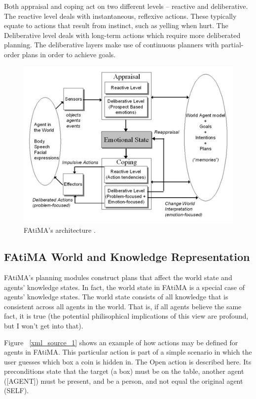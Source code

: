 \documentclass{article}
\begin{document}
Both appraisal and coping act on two different levels -- reactive and
deliberative.  The reactive level deals with instantaneous, reflexive
actions.  These typically equate to actions that result from instinct,
such as yelling when hurt.  The Deliberative level deals with long-term
actions which require more deliberated planning.  The deliberative layers
make use of continuous planners with partial-order plans in order to
achieve goals. \cite{Paiva2005, Russell2003}

\begin{figure}[htb]

\includegraphics{Graphics/fatimadiagram.png}
\caption{FAtiMA's architecture \cite{Paiva2005}.}
\label{fatima_arch}
\end{figure}

\subsection{FAtiMA World and Knowledge Representation}

FAtiMA's planning modules construct plans that affect the world state
and agents' knowledge states.  In fact, the world state in FAtiMA is
a special case of agents' knowledge states.  The world state consists
of all knowledge that is consistent across all agents in the world.
That is, if all agents believe the same fact, it is true (the potential
philisophical implications of this view are profound, but I won't get
into that).

Figure ~\ref{xml_source_1} shows an example of how actions may be defined
for agents in FAtiMA.  This particular action is part of a simple scenario
in which the user guesses which box a coin is hidden in.  The Open action
is described here.  Its preconditions state that the target (a box) must be
on the table, another agent ([AGENT]) must be present, and be a person, and
not equal the original agent (SELF).
\end{document}
